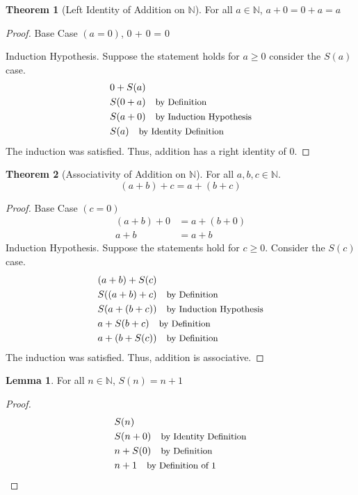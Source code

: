 \documentclass[12pt]{article}
\newcommand{\stext}[1]{\quad\text{\small #1}}
\theoremstyle{definition}
\newtheorem{theorem}{Theorem}
\newtheorem{lemma}{Lemma}
\begin{document}
\begin{theorem}[Left Identity of Addition on $\mathbb{N}$] For all $a \in \mathbb{N}$, $a + 0 = 0 + a = a$
\end{theorem}
\begin{proof}
    Base Case $(a = 0)$, 0 + 0 = 0

    Induction Hypothesis. Suppose the statement holds for $a \geq 0$ consider the $S(a)$ case.
    \begin{align*}
        & 0 + S(a) \\
        & S(0 + a) \stext{by Definition} \\
        & S(a + 0) \stext{by Induction Hypothesis} \\
        & S(a) \stext{by Identity Definition} \\
    \end{align*}
    The induction was satisfied. Thus, addition has a right identity of $0$.
\end{proof}

\begin{theorem}[Associativity of Addition on $\mathbb{N}$] 
    For all $a, b, c \in \mathbb{N}$. 
    \begin{equation*}
        (a + b) + c = a + (b + c)
    \end{equation*}
\end{theorem}

\begin{proof}
    Base Case $(c = 0)$
    \begin{align*}
        (a + b) + 0 &= a + (b + 0) \\
        a + b &= a + b
    \end{align*}
    Induction Hypothesis. Suppose the statements hold for $c \geq 0$. Consider the $S(c)$ case.
    \begin{align*}
            & (a + b) + S(c) \\
            & S((a + b) + c) \stext{by Definition} \\ 
            & S(a + (b + c)) \stext{by Induction Hypothesis} \\
            & a + S(b + c) \stext{by Definition} \\ 
            & a + (b + S(c)) \stext{by Definition}
    \end{align*}
    The induction was satisfied. Thus, addition is associative.
\end{proof}

\begin{lemma} For all $n \in \mathbb{N}$, $S(n) = n + 1$
\end{lemma}
\begin{proof}
    \begin{align*}
        & S(n) \\
        & S(n + 0) \stext{by Identity Definition} \\
        & n + S(0) \stext{by Definition} \\
        & n + 1 \stext{by Definition of 1}
    \end{align*}
\end{proof}
\end{document}
